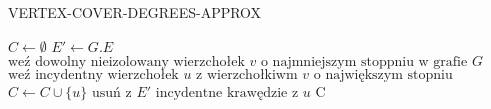 \begin{algorithm}
\caption{VERTEX-COVER-DEGREES-APPROX}\label{euclid}
\begin{algorithmic}[1]
\State $C \gets \emptyset$
\State $E' \gets G.E$
\State $\text{weź dowolny nieizolowany wierzchołek }v \text{ o najmniejszym stoppniu w grafie }G$
\State $\text{weź incydentny wierzchołek }u\text{ z wierzchołkiwm }v\text{ o największym stopniu}$
\State $C \gets C \cup \{u\}$
\State $\text{usuń z } E' \text{ incydentne krawędzie z } u$
\EndWhile
\State \Return C
\EndFunction
\end{algorithmic}
\end{algorithm}
